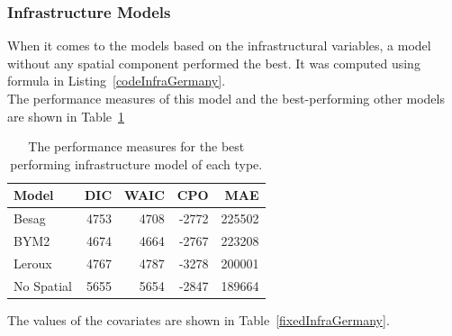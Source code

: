 \subsubsection{Infrastructure Models}\label{sssec:infraGermany}
When it comes to the models based on the infrastructural variables, a model without any spatial component performed the best. It was computed using formula in Listing~\ref{codeInfraGermany}. \\
The performance measures of this model and the best-performing other models are shown in Table~\ref{infraGermany}
\begin{table}[H] 
\caption{The performance measures for the best performing infrastructure model of each type. \label{infraGermany}}
\begin{tabular}{l r r r r}
\toprule
\textbf{Model}	& \textbf{DIC}	& \textbf{WAIC} & \textbf{CPO} & \textbf{MAE}\\
\midrule
Besag & 4753 & 4708 & -2772 & 225502\\
BYM2 & 4674 & 4664 & -2767 & 223208\\
Leroux & 4767 & 4787 & -3278 & 200001\\
No Spatial & 5655 & 5654 & -2847 & 189664\\
\bottomrule
\end{tabular}
\end{table}
The values of the covariates are shown in Table~\ref{fixedInfraGermany}.

